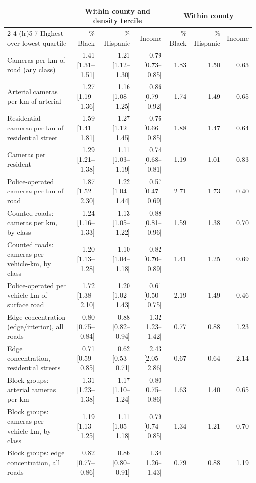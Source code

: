 \begin{tabular}{lrrrrrr}
\toprule
& \multicolumn{3}{c}{Within county and density tercile} & \multicolumn{3}{c}{Within county} \\
\cmidrule(lr){2-4} \cmidrule(lr){5-7}
Highest over lowest quartile & \% Black & \% Hispanic & Income & \% Black & \% Hispanic & Income \\
\midrule
Cameras per km of road (any class) & 1.41 [1.31--1.51] & 1.21 [1.12--1.30] & 0.79 [0.73--0.85] & 1.83 & 1.50 & 0.63 \\
Arterial cameras per km of arterial & 1.27 [1.19--1.36] & 1.16 [1.08--1.25] & 0.86 [0.79--0.92] & 1.74 & 1.49 & 0.65 \\
Residential cameras per km of residential street & 1.59 [1.41--1.81] & 1.27 [1.12--1.45] & 0.76 [0.66--0.85] & 1.88 & 1.47 & 0.64 \\
Cameras per resident & 1.29 [1.21--1.38] & 1.11 [1.03--1.19] & 0.74 [0.68--0.81] & 1.19 & 1.01 & 0.83 \\
Police-operated cameras per km of road & 1.87 [1.52--2.30] & 1.22 [1.04--1.44] & 0.57 [0.47--0.69] & 2.71 & 1.73 & 0.40 \\
\midrule
Counted roads: cameras per km, by class & 1.24 [1.16--1.33] & 1.13 [1.05--1.22] & 0.88 [0.81--0.96] & 1.59 & 1.38 & 0.70 \\
Counted roads: cameras per vehicle-km, by class & 1.20 [1.13--1.28] & 1.10 [1.04--1.18] & 0.82 [0.76--0.89] & 1.41 & 1.25 & 0.69 \\
Police-operated per vehicle-km of surface road & 1.72 [1.38--2.10] & 1.20 [1.02--1.43] & 0.61 [0.50--0.75] & 2.19 & 1.49 & 0.46 \\
\midrule
Edge concentration (edge/interior), all roads & 0.80 [0.75--0.84] & 0.88 [0.82--0.94] & 1.32 [1.23--1.42] & 0.77 & 0.88 & 1.23 \\
Edge concentration, residential streets & 0.71 [0.59--0.85] & 0.62 [0.53--0.71] & 2.43 [2.05--2.86] & 0.67 & 0.64 & 2.14 \\
\midrule
Block groups: arterial cameras per km & 1.31 [1.23--1.38] & 1.17 [1.10--1.24] & 0.80 [0.75--0.86] & 1.63 & 1.40 & 0.65 \\
Block groups: cameras per vehicle-km, by class & 1.19 [1.13--1.25] & 1.11 [1.05--1.18] & 0.79 [0.74--0.85] & 1.34 & 1.21 & 0.70 \\
Block groups: edge concentration, all roads & 0.82 [0.77--0.86] & 0.86 [0.80--0.91] & 1.34 [1.26--1.43] & 0.79 & 0.88 & 1.19 \\
\bottomrule
\end{tabular}
